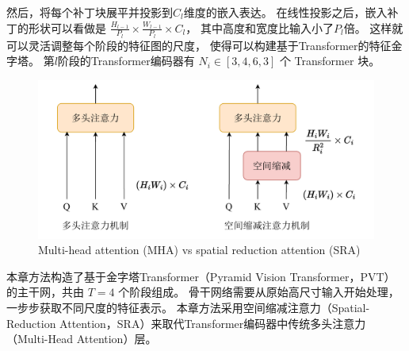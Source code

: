 然后，将每个补丁块展平并投影到$C_{l}$维度的嵌入表达。
在线性投影之后，嵌入补丁的形状可以看做是
$\frac{H_{l-1}}{P_{l}} \times \frac{W_{l-1}}{P_{l}} \times C_{l} $，
其中高度和宽度比输入小了$P_{l}$倍。
这样就可以灵活调整每个阶段的特征图的尺度，
使得可以构建基于Transformer的特征金字塔。
%
%
%
%
第$l$阶段的Transformer编码器有 $ N_{i} \in [3,4,6,3] $ 个 Transformer 块。
%
%
%
%
%
\begin{figure}[!ht]
	\centering
	\includegraphics[width=0.95\linewidth]{figures/chapter3/sra}
	{Multi-head attention (MHA) vs spatial reduction attention (SRA)}  
	\label{cpt3_fig1:sra}
\end{figure}




本章方法构造了基于金字塔Transformer（Pyramid Vision Transformer，PVT）
的主干网，共由 $T = 4$ 个阶段组成。 
骨干网络需要从原始高尺寸输入开始处理，一步步获取不同尺度的特征表示。
本章方法采用空间缩减注意力（Spatial-Reduction Attention，SRA）来取代Transformer编码器中传统多头注意力（Multi-Head Attention）层。



